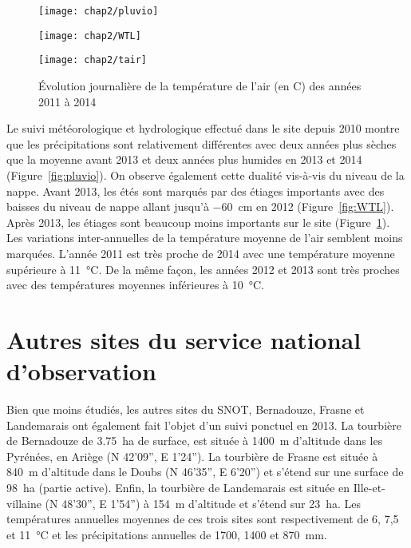 \begin{figure}
\centering
\texttt{[image: chap2/pluvio]}\\
\caption{Évolution horaire de la pluviométrie, en \si{\mm}, des années 2011 à 2014}
\label{fig:pluvio}
\texttt{[image: chap2/WTL]}\\
\caption{Évolution du niveau de la nappe, en cm par rapport à la surface, des années 2011 à 2014}
\label{fig:WTL}
\texttt{[image: chap2/tair]}
\caption{Évolution journalière de la température de l'air (en \textdegree C) des années 2011 à 2014}
\label{fig:tair}
\end{figure}

Le suivi météorologique et hydrologique effectué dans le site depuis 2010 montre que les précipitations sont relativement différentes avec deux années plus sèches que la moyenne avant 2013 et deux années plus humides en 2013 et 2014 (Figure~\ref{fig:pluvio}).
On observe également cette dualité vis-à-vis du niveau de la nappe.
Avant 2013, les étés sont marqués par des étiages importants avec des baisses du niveau de nappe allant jusqu'à \SI{-60}{\cm} en 2012 (Figure~\ref{fig:WTL}).
Après 2013, les étiages sont beaucoup moins importants sur le site (Figure~\ref{fig:tair}).
Les variations inter-annuelles de la température moyenne de l'air semblent moins marquées.
L'année 2011 est très proche de 2014 avec une température moyenne supérieure à \SI{11}{\degreeCelsius}.
De la même façon, les années 2012 et 2013 sont très proches avec des températures moyennes inférieures à  \SI{10}{\degreeCelsius}.


\singlespacing
\section{Autres sites du service national d'observation}
\doublespacing

Bien que moins étudiés, les autres sites du SNOT, Bernadouze, Frasne et Landemarais ont également fait l'objet d'un suivi ponctuel en 2013.
La tourbière de Bernadouze de \SI{3.75}{\hectare} de surface, est située à \SI{1400}{\metre} d'altitude dans les Pyrénées, en Ariège (N 42’09”, E 1’24”).
La tourbière de Frasne est située à \SI{840}{\metre} d'altitude dans le Doubs (N 46’35”, E 6’20”) et s'étend sur une surface de \SI{98}{\hectare} (partie active).
Enfin, la tourbière de Landemarais est située en Ille-et-villaine (N 48’30”, E 1’54”) à \SI{154}{\metre} d'altitude et s'étend sur \SI{23}{\hectare}.
Les températures annuelles moyennes de ces trois sites sont respectivement de 6, 7,5 et \SI{11}{\degreeCelsius} et les précipitations annuelles de \num{1700}, \num{1400} et \SI{870}{\milli\meter}.

